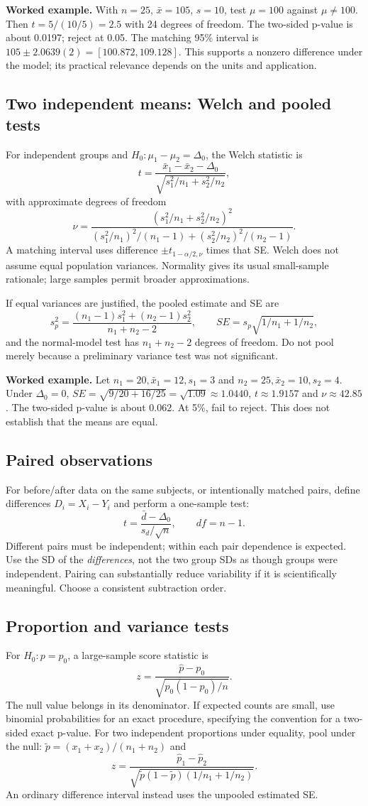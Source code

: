 \textbf{Worked example.} With $n=25$, $\bar x=105$, $s=10$, test $\mu=100$
against $\mu\ne100$. Then $t=5/(10/5)=2.5$ with 24 degrees of freedom.
The two-sided p-value is about 0.0197; reject at 0.05. The matching 95\%
interval is $105\pm2.0639(2)=[100.872,109.128]$.
This supports a nonzero difference under the model; its practical relevance
depends on the units and application.

\subsection{Two independent means: Welch and pooled tests}
For independent groups and $H_0:\mu_1-\mu_2=\Delta_0$, the Welch statistic is
\[
t=\frac{\bar x_1-\bar x_2-\Delta_0}
{\sqrt{s_1^2/n_1+s_2^2/n_2}},
\]
with approximate degrees of freedom
\[
\nu=\frac{(s_1^2/n_1+s_2^2/n_2)^2}
{(s_1^2/n_1)^2/(n_1-1)+(s_2^2/n_2)^2/(n_2-1)}.
\]
A matching interval uses difference $\pm t_{1-\alpha/2,\nu}$ times that SE.
Welch does not assume equal population variances. Normality gives its usual
small-sample rationale; large samples permit broader approximations.

If equal variances are justified, the pooled estimate and SE are
\[
s_p^2=\frac{(n_1-1)s_1^2+(n_2-1)s_2^2}{n_1+n_2-2},\qquad
SE=s_p\sqrt{1/n_1+1/n_2},
\]
and the normal-model test has $n_1+n_2-2$ degrees of freedom.
Do not pool merely because a preliminary variance test was not significant.

\textbf{Worked example.} Let $n_1=20,\bar x_1=12,s_1=3$ and
$n_2=25,\bar x_2=10,s_2=4$. Under $\Delta_0=0$,
$SE=\sqrt{9/20+16/25}=\sqrt{1.09}\approx1.0440$,
$t\approx1.9157$ and $\nu\approx42.85$. The two-sided p-value is about
0.062. At 5\%, fail to reject. This does not establish that the means are equal.

\subsection{Paired observations}
For before/after data on the same subjects, or intentionally matched pairs,
define differences $D_i=X_i-Y_i$ and perform a one-sample test:
\[
t=\frac{\bar d-\Delta_0}{s_d/\sqrt n},\qquad df=n-1.
\]
Different pairs must be independent; within each pair dependence is expected.
Use the SD of the \emph{differences}, not the two group SDs as though groups
were independent. Pairing can substantially reduce variability if it is
scientifically meaningful. Choose a consistent subtraction order.

\subsection{Proportion and variance tests}
For $H_0:p=p_0$, a large-sample score statistic is
\[
z=\frac{\hat p-p_0}{\sqrt{p_0(1-p_0)/n}}.
\]
The null value belongs in its denominator. If expected counts are small,
use binomial probabilities for an exact procedure, specifying the convention
for a two-sided exact p-value. For two independent proportions under equality,
pool under the null: $\tilde p=(x_1+x_2)/(n_1+n_2)$ and
\[
z=\frac{\hat p_1-\hat p_2}
{\sqrt{\tilde p(1-\tilde p)(1/n_1+1/n_2)}}.
\]
An ordinary difference interval instead uses the unpooled estimated SE.

